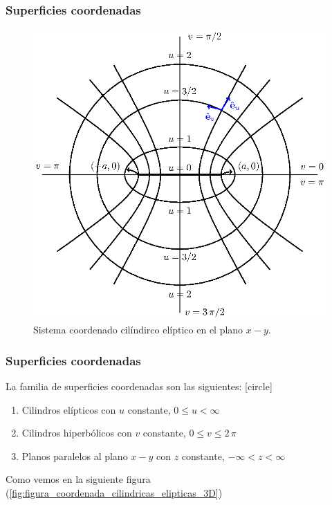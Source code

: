 \documentclass[12pt]{beamer}
\begin{document}
\begin{frame}
\frametitle{Superficies coordenadas}
\begin{figure}[H]
    \centering
    \includegraphics[scale=0.6]{Imagenes/Sistema_Cilindrico_Eliptico.eps}
    \caption{Sistema coordenado cilíndirco elíptico en el plano $x-y$.}
    \label{fig:figura_coordenada_cilindricas_elipticas}
\end{figure}
\end{frame}
\begin{frame}
\frametitle{Superficies coordenadas}
La familia de superficies coordenadas son las siguientes:
[circle]
\begin{enumerate}
\item Cilindros elípticos con $u$ constante, $0 \leq u < \infty$
\item Cilindros hiperbólicos con $v$ constante, $0 \leq v \leq 2 \, \pi$
\item Planos paralelos al plano $x-y$ con $z$ constante, $-\infty < z < \infty$
\end{enumerate}
Como vemos en la siguiente figura (\ref{fig:figura_coordenada_cilindricas_elipticas_3D})
\end{frame}
\end{document}
